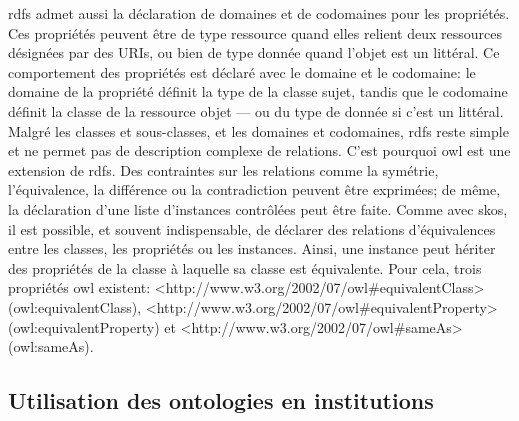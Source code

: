 \ac{rdfs} admet aussi la déclaration de domaines et de codomaines pour les propriétés. Ces propriétés peuvent être de type ressource quand elles relient deux ressources désignées par des URIs, ou bien de type donnée quand l'objet est un littéral. Ce comportement des propriétés est déclaré avec le domaine et le codomaine: le domaine de la propriété définit la type de la classe sujet, tandis que le codomaine définit la classe de la ressource objet --- ou du type de donnée si c'est un littéral.\\

Malgré les classes et sous-classes, et les domaines et codomaines, \ac{rdfs} reste simple et ne permet pas de description complexe de relations. C'est pourquoi \ac{owl} est une extension de \ac{rdfs}. Des contraintes sur les relations comme la symétrie, l'équivalence, la différence ou la contradiction peuvent être exprimées; de même, la déclaration d'une liste d'instances contrôlées peut être faite. Comme avec \ac{skos}, il est possible, et souvent indispensable, de déclarer des relations d'équivalences entre les classes, les propriétés ou les instances. Ainsi, une instance peut hériter des propriétés de la classe à laquelle sa classe est équivalente. Pour cela, trois propriétés \ac{owl} existent: <http://www.w3.org/2002/07/owl\#equivalentClass> (owl:equivalentClass), <http://www.w3.org/2002/07/owl\#equivalentProperty> (owl:equivalentProperty) et <http://www.w3.org/2002/07/owl\#sameAs> (owl:sameAs).

\subsection{\label{II-B-3-b}Utilisation des ontologies en institutions}

